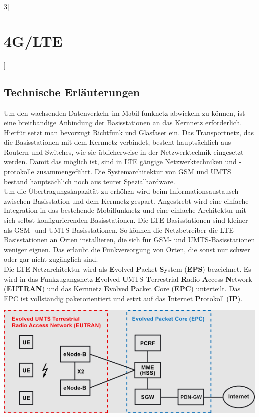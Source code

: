 \begin{multicols}{3}[\section{4G/LTE}]
\subsection*{Technische Erläuterungen}
Um den wachsenden Datenverkehr im Mobil-funknetz abwickeln zu können, ist eine breitbandige Anbindung der Basisstationen an das Kernnetz erforderlich. Hierfür setzt man bevorzugt Richtfunk und Glasfaser ein. Das Transportnetz, das die Basisstationen mit dem Kernnetz verbindet, besteht hauptsächlich aus Routern und Switches, wie sie üblicherweise in der Netzwerktechnik eingesetzt werden. Damit das möglich ist, sind in LTE gängige Netzwerktechniken und -protokolle zusammengeführt. Die Systemarchitektur von GSM und UMTS bestand hauptsächlich noch aus teurer Spezialhardware. \\
Um die Übertragungskapazität zu erhöhen wird beim Informationsaustausch zwischen Basisstation und dem Kernnetz gespart. Angestrebt wird eine einfache Integration in das bestehende Mobilfunknetz und eine einfache Architektur mit sich selbst konfigurierenden Basisstationen.
Die LTE-Basisstationen sind kleiner als GSM- und UMTS-Basisstationen. So können die Netzbetreiber die LTE-Basisstationen an Orten installieren, die sich für GSM- und UMTS-Basisstationen weniger eignen. Das erlaubt die Funkversorgung von Orten, die sonst nur schwer oder gar nicht zugänglich sind. \\
Die LTE-Netzarchitektur wird als \textbf{E}volved \textbf{P}acket \textbf{S}ystem (\textbf{EPS}) bezeichnet. Es wird in das Funkzugangsnetz \textbf{E}volved \textbf{U}MTS \textbf{T}errestrial \textbf{R}adio \textbf{A}ccess \textbf{N}etwork (\textbf{EUTRAN}) und das Kernnetz \textbf{E}volved \textbf{P}acket \textbf{C}ore (\textbf{EPC}) unterteilt. Das EPC ist vollständig paketorientiert und setzt auf das \textbf{I}nternet \textbf{P}rotokoll (\textbf{IP}).

\begin{Figure}
\includegraphics[width=\linewidth]{Kapitel/4GLTE/Grafiken/Modell.png}
\end{Figure}


\end{multicols}
